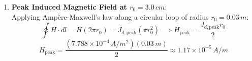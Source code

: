 \begin{example}
\begin{enumerate}
    \item \textbf{Peak Induced Magnetic Field at $r_0 = 3.0\,\si{cm}$}:\\
    Applying Ampère-Maxwell's law along a circular loop of radius $r_0 = 0.03\,\si{m}$:
    \begin{equation*}
        \oint H \cdot dl = H(2\pi r_0) = J_{d,\text{peak}} (\pi r_0^2) \implies H_{\text{peak}} = \frac{J_{d,\text{peak}} r_0}{2}
    \end{equation*}
    \begin{equation*}
        H_{\text{peak}} = \frac{(7.788 \times 10^{-4}\,\si{A/m^2})(0.03\,\si{m})}{2} \approx 1.17 \times 10^{-5}\,\si{A/m}
    \end{equation*}
\end{enumerate}
\end{example}

